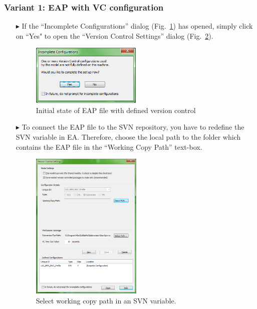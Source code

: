 \subsubsection{Variant 1: EAP with VC configuration}
\begin{enumerate}
  \item[$\blacktriangleright$] If the ``Incomplete Configurations'' dialog (Fig.~\ref{fig:advanced-topics-eaSVN-incompleteConf}) has opened, simply click on ``Yes" to open the ``Version Control Settings'' dialog (Fig.~\ref{fig:advanced-topics-eaSVN-setWorkingCopyPath}).
\begin{figure}[!htbp]
\begin{center}
	\includegraphics[width=0.5\textwidth]{pics/advancedTopics/eaSVN/DemoLanguages/011.png}
	\caption{Initial state of EAP file with defined version control}
  	\label{fig:advanced-topics-eaSVN-incompleteConf}
\end{center}
\end{figure}

   \item[$\blacktriangleright$] To connect the EAP file to the SVN repository, you have to redefine the SVN variable in EA. Therefore, choose the local path to the folder which contains the EAP file in the ``Working Copy Path'' text-box.

\begin{figure}[!htbp]
\begin{center}
	\includegraphics[width=0.5\textwidth]{pics/advancedTopics/eaSVN/DemoLanguages/012.png}
	\caption{Select working copy path in an SVN variable.}
  	\label{fig:advanced-topics-eaSVN-setWorkingCopyPath}
\end{center}
\end{figure}
\end{enumerate}



